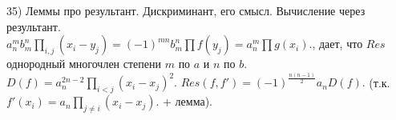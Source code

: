 35) Леммы про результант. Дискриминант, его смысл. Вычисление через результант.\\
$a_n^mb_m^n \prod_{i,j} (x_i-y_j)=(-1)^{mn}b_m^n \prod f(y_j)=a_n^m \prod g(x_i).$, дает, что $Res$ однородный многочлен степени $m$ по $a$ и $n$ по $b$. $D(f)=a_n^{2n-2}\prod_{i < j} (x_i-x_j)^2.$ $Res(f,f')=(-1)^{\frac{n(n-1)}{2}} a_n D(f).$ (т.к. $f'(x_i)=a_n\prod_{j \neq i}(x_i-x_j).$ + лемма).
\\

